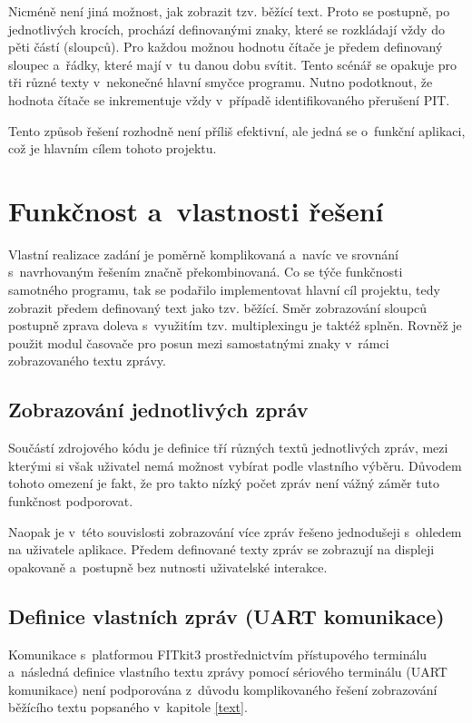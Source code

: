 \documentclass[a4paper, 11pt]{article}
\begin{document}
    Nicméně není jiná možnost, jak zobrazit tzv. běžící text.
    Proto se postupně, po jednotlivých krocích, prochází definovanými znaky, které se rozkládají vždy do pěti částí (sloupců).
    Pro každou možnou hodnotu čítače je předem definovaný sloupec a~řádky, které mají v~tu danou dobu svítit.
    Tento scénář se opakuje pro tři různé texty v~nekonečné hlavní smyčce programu.
    Nutno podotknout, že hodnota čítače se inkrementuje vždy v~případě identifikovaného přerušení PIT.

    Tento způsob řešení rozhodně není příliš efektivní, ale jedná se o~funkční aplikaci, což je hlavním cílem tohoto projektu.

\newpage

\section{Funkčnost a~vlastnosti řešení}
    Vlastní realizace zadání je poměrně komplikovaná a~navíc ve srovnání s~navrhovaným řešením značně překombinovaná.
    Co se týče funkčnosti samotného programu, tak se podařilo implementovat hlavní cíl projektu, tedy zobrazit předem definovaný text jako tzv. běžící.
    Směr zobrazování sloupců postupně zprava doleva s~využitím tzv. multiplexingu je taktéž splněn.
    Rovněž je použit modul časovače pro posun mezi samostatnými znaky v~rámci zobrazovaného textu zprávy.

\subsection{Zobrazování jednotlivých zpráv}
    Součástí zdrojového kódu je definice tří různých textů jednotlivých zpráv, mezi kterými si však uživatel nemá možnost vybírat podle vlastního výběru.
    Důvodem tohoto omezení je fakt, že pro takto nízký počet zpráv není vážný záměr tuto funkčnost podporovat.

    Naopak je v~této souvislosti zobrazování více zpráv řešeno jednodušeji s~ohledem na uživatele aplikace.
    Předem definované texty zpráv se zobrazují na displeji opakovaně a~postupně bez nutnosti uživatelské interakce.

\subsection{Definice vlastních zpráv (UART komunikace)}
    Komunikace s~platformou FITkit3 prostřednictvím přístupového terminálu a~následná definice vlastního textu zprávy pomocí sériového terminálu (UART komunikace) není podporována z~důvodu komplikovaného řešení zobrazování běžícího textu popsaného v~kapitole \ref{text}.
\end{document}
